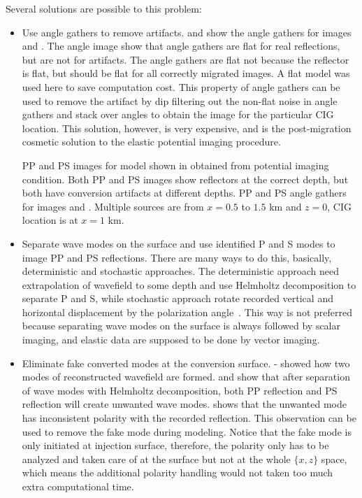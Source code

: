 Several solutions are possible to this problem:
\begin{itemize}
\item Use angle gathers to remove artifacts.  and  show the angle gathers for images  and . The angle image show that angle gathers are flat for real reflections, but are not for artifacts. The angle gathers are flat not because the reflector is flat, but should be flat for all correctly migrated images. A flat model was used here to save computation cost. This property of angle gathers can be used to remove the artifact by dip filtering out the non-flat noise in angle gathers and stack over angles to obtain the image for the particular CIG location.
This solution, however, is very expensive, and is the post-migration cosmetic solution to the elastic potential imaging procedure.


{PP and PS images for model shown in  obtained from potential imaging condition. Both PP and PS images show reflectors at the correct depth, but
both have conversion artifacts at different depths.}
{PP and PS angle gathers for images 
and . Multiple sources are from $x=0.5$ to $1.5$ km and
$z=0$, CIG location is at $x=1$ km.}

\item Separate wave modes on the surface and use identified P and S modes to image PP and PS reflections. There are many ways to do this, basically, deterministic and stochastic approaches. The deterministic approach need extrapolation of wavefield to some depth and use Helmholtz decomposition to separate P and S, while stochastic approach rotate recorded vertical and horizontal displacement by the polarization angle~\cite[]{SEG-1989-1308}.
This way is not preferred because separating wave modes on the surface
is always followed by scalar imaging, and elastic data are supposed to
be done by vector imaging.


\item Eliminate fake converted modes at the conversion surface. - showed how two modes of reconstructed wavefield are formed.  and  show that after separation of wave modes with Helmholtz decomposition, both PP reflection and PS reflection will create unwanted wave modes.  shows that the unwanted mode has inconsistent polarity with the recorded reflection. This observation can be used to remove the fake mode during modeling. Notice that the fake mode is only initiated at injection surface, therefore, the polarity only has to be analyzed and taken care of at the surface but not at the whole $\{x,z\}$ space, which means the additional polarity handling would not taken too much extra computational time.


\end{itemize}
